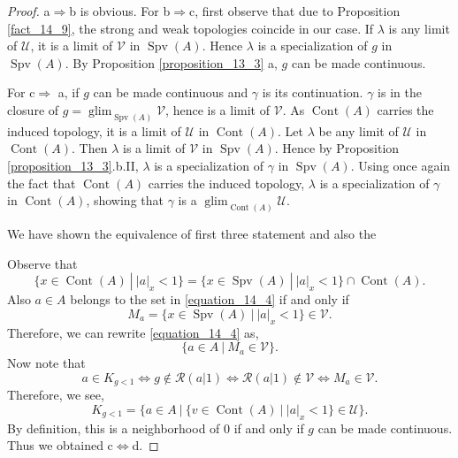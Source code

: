 \documentclass[10pt]{article}
\numberwithin{equation}{section}
\theoremstyle{definition}
\DeclareMathOperator{\glim}{glim}
\DeclareMathOperator{\Spv}{Spv}
\DeclareMathOperator{\Cont}{Cont}
\newcommand{\U}[0]{\mathcal{U}}
\newcommand{\cR}[0]{\mathcal{R}}
\newcommand{\sep}[0]{\:|\:}
\newcommand{\ab}[1]{\vert #1 \vert}
\newcommand{\cV}[0]{\mathcal{V}}
\begin{document}
\begin{proof}
    a$\Rightarrow$b is obvious. For b$\Rightarrow$c, first observe that due to Proposition \ref{fact_14_9}, the strong and weak topologies coincide in our case. If $\lambda$ is any limit of $\U$, it is a limit of $\cV$ in $\Spv(A)$.
    Hence $\lambda$ is a specialization of $g$ in $\Spv(A)$. By Proposition \ref{proposition_13_3} a, $g$ can be made continuous.
    \par For c$\Rightarrow $ a, if $g$ can be made continuous and $\gamma$ is its continuation. $\gamma$ is in the closure of $g=\glim_{\Spv(A)}\cV$, hence is a limit of $\cV$. As $\Cont(A)$ carries the induced topology, it is a limit of $\U$ in $\Cont(A)$. Let $\lambda$ be any limit of $\U$ in $\Cont(A)$. Then $\lambda$ is a limit of $\cV$ in $\Spv(A)$. Hence by Proposition \ref{proposition_13_3}.b.II, $\lambda$ is a specialization of $\gamma$ in $\Spv(A)$. Using once again the fact that $\Cont(A)$ carries the induced topology, $\lambda$ is a specialization of $\gamma$ in $\Cont(A)$, showing that $\gamma$ is a $\glim_{\Cont(A)}\U$.
    \par We have shown the equivalence of first three statement and also the
    \par Observe that
    \begin{equation*}
        \{x\in\Cont(A)\sep \ab{a}_x<1\} = \{x\in\Spv(A)\sep \ab{a}_x<1\}\cap\Cont(A).
    \end{equation*}
    Also $a\in A$ belongs to the set in \eqref{equation_14_4} if and only if
    \begin{equation*}
        M_a = \{x\in\Spv(A)\sep \ab{a}_x<1\}\in\cV.
    \end{equation*}Therefore, we can rewrite \eqref{equation_14_4} as,
    \begin{equation*}
        \{a\in A\sep M_a\in\cV\}.
    \end{equation*}
    Now note that
    \begin{equation*}
        a\in K_{g<1}\Leftrightarrow g\not\in\cR(a|1)\Leftrightarrow \cR(a|1)\not\in \mathcal{V}\Leftrightarrow M_a\in\mathcal{V}.
    \end{equation*}
    Therefore, we see,
    \begin{equation*}
        K_{g<1} = \{a\in A\sep \{v\in\Cont(A)\sep \ab{a}_x<1\}\in\U\}.
    \end{equation*}
    By definition, this is a neighborhood of $0$ if and only if $g$ can be made continuous. Thus we obtained c$\Leftrightarrow$d.

\end{proof}
\end{document}
